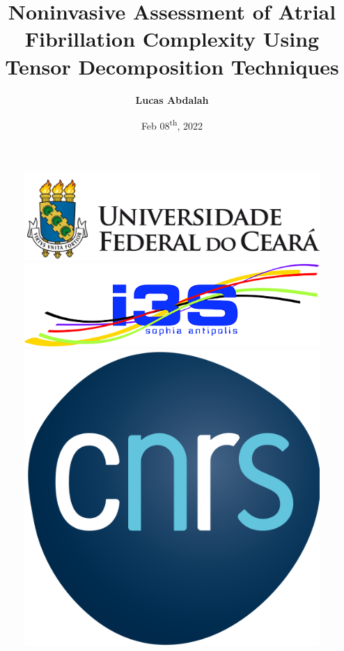 \documentclass{beamer}
\title[Undergraduate Thesis Seminar - TI0133]{Noninvasive Assessment of Atrial Fibrillation Complexity Using Tensor Decomposition Techniques}
\author[Lucas Abdalah]{\textbf{Lucas Abdalah}}
\institute[]{\small {Advisor: Prof. Walter da Cruz Freitas Jr}}
\date{{Feb 08{\textsuperscript{th}}, 2022}}
\begin{document}
	\begin{frame}
		\begin{figure}[!htb]
			\centering
			{\includegraphics[scale=0.065]{logo/UFC_Logo_300.png} \hspace{10px} \includegraphics[scale=0.150]{logo/I3S_logo} \hspace{20px} \includegraphics[scale=0.025]{logo/CNRS_logo.png}}
		\end{figure}

		\titlepage
	\end{frame}
\end{document}
